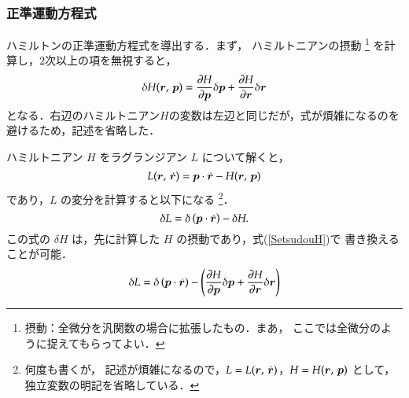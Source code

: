             \subsubsection{正準運動方程式}
                ハミルトンの正準運動方程式を導出する．まず，
                ハミルトニアンの摂動
                    \footnote{
                        摂動：全微分を汎関数の場合に拡張したもの．まあ，
                        ここでは全微分のように捉えてもらってよい．
                    }
                を計算し，2次以上の項を無視すると，
                    \begin{align}\label{SetsudouH}
                        \delta H(\br,\,\bp) =   \frac{\rd H}{\rd \bp} \delta \bp
                                              + \frac{\rd H}{\rd \br} \delta \br
                    \end{align}
                となる．右辺のハミルトニアン$H$の変数は左辺と同じだが，式が煩雑になるのを
                避けるため，記述を省略した．

                ハミルトニアン $H$ をラグランジアン $L$ について解くと，
                    \begin{equation*}
                         L(\boldsymbol{r},\,\dot{\boldsymbol{r}}) = \boldsymbol{p} \cdot \dot{\boldsymbol{r}} - H(\boldsymbol{r},\,\boldsymbol{p})
                    \end{equation*}
                であり，$L$ の変分を計算すると以下になる
                        \footnote{
                        何度も書くが，
                            記述が煩雑になるので，$L=L(\boldsymbol{r},\,\dot{\boldsymbol{r}})$，$H=H(\boldsymbol{r},\,\boldsymbol{p})$ として，
                            独立変数の明記を省略している．
                        }．
                    \begin{equation*}
                         \delta L = \delta \left(\boldsymbol{p} \cdot \dot{\boldsymbol{r}}\right) - \delta H.
                    \end{equation*}
                この式の $\delta H$ は，先に計算した $H$ の摂動であり，式(\ref{SetsudouH})で
                書き換えることが可能．
                                        \begin{align}\label{eq:SetsudouH2}
                        \delta L = \delta \left(\bp \cdot \dot{\br}\right)
                             - \left(
                                \frac{\rd H}{\rd \bp} \delta \bp
                                + \frac{\rd H}{\rd \br} \delta \br
                             \right)
                                        \end{align}

